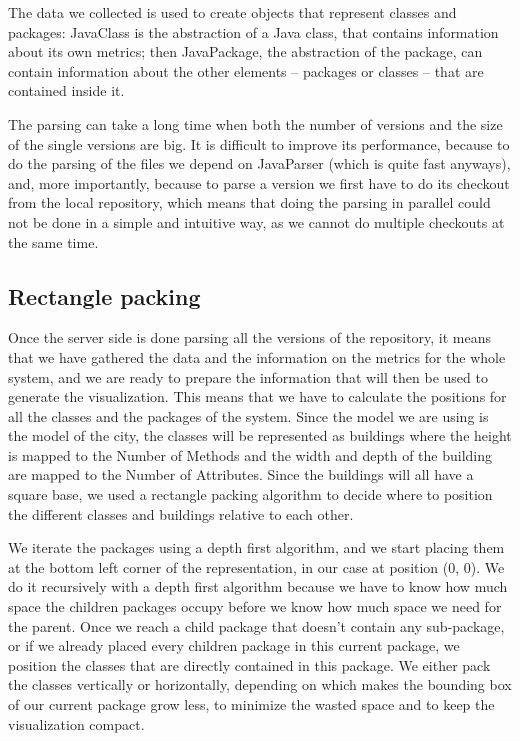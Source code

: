 \documentclass[]{usiinfbachelorproject}
\begin{document}
The data we collected is used to create objects that represent classes and packages: JavaClass is the abstraction of a Java class, that contains information about its own metrics; then JavaPackage, the abstraction of the package, can contain information about the other elements -- packages or classes -- that are contained inside it.

The parsing can take a long time when both the number of versions and the size of the single versions are big.
It is difficult to improve its performance, because to do the parsing of the files we depend on JavaParser (which is quite fast anyways), and, more importantly, because to parse a version we first have to do its checkout from the local repository, which means that doing the parsing in parallel could not be done in a simple and intuitive way, as we cannot do multiple checkouts at the same time.

\subsection{Rectangle packing} \label{Rectangle packing}
Once the server side is done parsing all the versions of the repository, it means that we have gathered the data and the information on the metrics for the whole system, and we are ready to prepare the information that will then be used to generate the visualization. This means that we have to calculate the positions for all the classes and the packages of the system. Since the model we are using is the model of the city, the classes will be represented as buildings where the height is mapped to the Number of Methods and the width and depth of the building are mapped to the Number of Attributes. Since the buildings will all have a square base, we used a rectangle packing algorithm to decide where to position the different classes and buildings relative to each other.

We iterate the packages using a depth first algorithm, and we start placing them at the bottom left corner of the representation, in our case at position (0, 0). We do it recursively with a depth first algorithm because we have to know how much space the children packages occupy before we know how much space we need for the parent.
Once we reach a child package that doesn't contain any sub-package, or if we already placed every children package in this current package, we position the classes that are directly contained in this package. We either pack the classes vertically or horizontally, depending on which makes the bounding box of our current package grow less, to minimize the wasted space and to keep the visualization compact.
\end{document}
